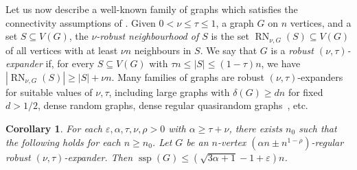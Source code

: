 \documentclass[a4paper, 11pt,reqno]{amsart}
\theoremstyle{plain}
\newtheorem{corollary}[theorem]{Corollary}
\theoremstyle{definition}
\numberwithin{equation}{section}
\DeclareMathOperator{\ssp}{ssp}
\newcommand{\eps}{\varepsilon}
\begin{document}
%
% 
%
%
%

Let us now describe a well-known family of graphs which satisfies the
connectivity assumptions of .  Given $0 < \nu \leq
\tau \leq 1$, a graph $G$ on $n$ vertices, and a set $S \subseteq
V(G)$, the \emph{$\nu$-robust neighbourhood of $S$} is the set
$\operatorname{RN}_{\nu, G}(S) \subseteq V(G)$ of all vertices with at
least $\nu n$ neighbours in $S$.  We say that $G$ is a \emph{robust
$(\nu, \tau)$-expander} if, for every $S \subseteq V(G)$ with $\tau n
\leq |S| \leq (1 - \tau)n$, we have $|{\operatorname{RN}}_{\nu, G}(S)|
\geq |S| + \nu n$.  Many families of graphs are robust $(\nu,
\tau)$-expanders for suitable values of $\nu, \tau$, including large
graphs with $\delta(G) \geq dn$ for fixed $d > 1/2$, dense random graphs,
dense regular quasirandom graphs~\cite[Lemma 5.8]{KuhnOsthus2014},
etc.

\begin{corollary}\label{coro:robustexpander-robustconnected}
	For each $\eps, \alpha, \tau, \nu, \rho > 0$ with $\alpha \geq
        \tau + \nu$, there exists $n_0$ such that the following holds
        for each $n \geq n_0$.  Let $G$ be an $n$-vertex ${(\alpha n
          \pm n^{1 - \rho})}$-regular robust $(\nu, \tau)$-expander.
        Then $\ssp(G) \leq (\sqrt{3 \alpha + 1} - 1 + \eps)n$.
\end{corollary}
\end{document}
